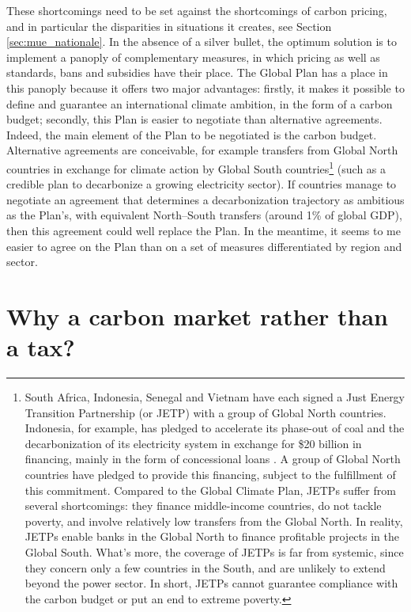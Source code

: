 \documentclass[a5paper,english,openany]{memoir}
\begin{document}
These shortcomings need to be set against the shortcomings of carbon pricing, and in particular the disparities in situations it creates, see Section \ref{sec:mue_nationale}. In the absence of a silver bullet, the optimum solution is to implement a panoply of complementary measures, in which pricing as well as standards, bans and subsidies have their place. The Global Plan has a place in this panoply because it offers two major advantages: firstly, it makes it possible to define and guarantee an international climate ambition, in the form of a carbon budget; secondly, this Plan is easier to negotiate than alternative agreements. Indeed, the main element of the Plan to be negotiated is the carbon budget. Alternative agreements are conceivable, for example transfers from Global North countries in exchange for climate action by Global South countries\footnote{South Africa, Indonesia, Senegal and Vietnam have each signed a Just Energy Transition Partnership (or JETP) with a group of Global North countries. Indonesia, for example, has pledged to accelerate its phase-out of coal and the decarbonization of its electricity system in exchange for \$20 billion in financing, mainly in the form of concessional loans \citep{ha-duong_just_2023}. A group of Global North countries have pledged to provide this financing, subject to the fulfillment of this commitment. Compared to the Global Climate Plan, JETPs suffer from several shortcomings: they finance middle-income %
countries, do not tackle poverty, and involve relatively low transfers from the Global North. In reality, JETPs enable banks in the Global North to finance profitable projects in the Global South. What's more, the coverage of JETPs is far from systemic, since they concern only a few countries in the South, and are unlikely to extend beyond the power sector. In short, JETPs cannot guarantee compliance with the carbon budget or put an end to extreme poverty.} 
(such as a credible plan to decarbonize a growing electricity sector). If countries manage to negotiate an agreement that determines a decarbonization trajectory as ambitious as the Plan's, with equivalent North--South transfers (around 1\% of global GDP), then this agreement could well replace the Plan. In the meantime, it seems to me easier to agree on the Plan than on a set of measures differentiated by region and sector.


\section*{\normalsize Why a carbon market rather than a tax?}\label{q:taxe}
\end{document}
